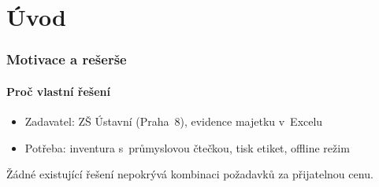 \documentclass[czech,blue]{ctufit-presentation}
\begin{document}
\begin{frame}[plain,t]
	\titlepage
\end{frame}

\section{Úvod}

\begin{frame}
	\frametitle{Motivace a rešerše}
	\framesubtitle{Proč vlastní řešení}
	\begin{itemize}
		\item Zadavatel: ZŠ Ústavní (Praha~8), evidence majetku v~Excelu
		\item Potřeba: inventura s~průmyslovou čtečkou, tisk etiket, offline režim
	\end{itemize}
	\vspace{0.3em}
	\begin{center}
		\footnotesize
		\setlength{\tabcolsep}{3pt}
	\end{center}
	\vspace{0.3em}
	{\small Žádné existující řešení nepokrývá kombinaci požadavků za přijatelnou cenu.}
\end{frame}

\end{document}
